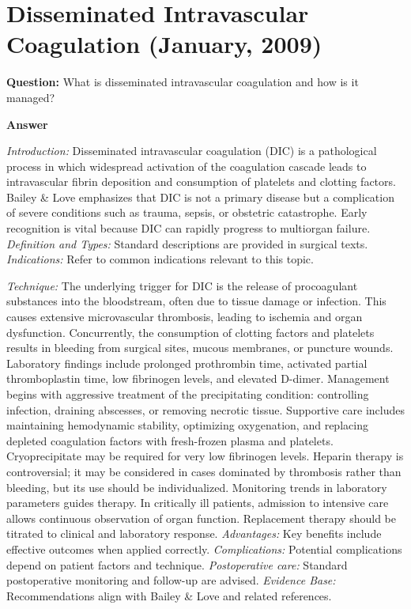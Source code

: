 \documentclass{article}
\begin{document}
\section{Disseminated Intravascular Coagulation (January, 2009)}

\textbf{Question:} What is disseminated intravascular coagulation and how is it managed?

\textbf{Answer}

\emph{Introduction:} Disseminated intravascular coagulation (DIC) is a pathological process in which widespread activation of the coagulation cascade leads to intravascular fibrin deposition and consumption of platelets and clotting factors. Bailey & Love emphasizes that DIC is not a primary disease but a complication of severe conditions such as trauma, sepsis, or obstetric catastrophe. Early recognition is vital because DIC can rapidly progress to multiorgan failure.
\emph{Definition and Types:} Standard descriptions are provided in surgical texts.
\emph{Indications:} Refer to common indications relevant to this topic.

\emph{Technique:} The underlying trigger for DIC is the release of procoagulant substances into the bloodstream, often due to tissue damage or infection. This causes extensive microvascular thrombosis, leading to ischemia and organ dysfunction. Concurrently, the consumption of clotting factors and platelets results in bleeding from surgical sites, mucous membranes, or puncture wounds. Laboratory findings include prolonged prothrombin time, activated partial thromboplastin time, low fibrinogen levels, and elevated D-dimer. Management begins with aggressive treatment of the precipitating condition: controlling infection, draining abscesses, or removing necrotic tissue. Supportive care includes maintaining hemodynamic stability, optimizing oxygenation, and replacing depleted coagulation factors with fresh-frozen plasma and platelets. Cryoprecipitate may be required for very low fibrinogen levels. Heparin therapy is controversial; it may be considered in cases dominated by thrombosis rather than bleeding, but its use should be individualized. Monitoring trends in laboratory parameters guides therapy. In critically ill patients, admission to intensive care allows continuous observation of organ function. Replacement therapy should be titrated to clinical and laboratory response.
\emph{Advantages:} Key benefits include effective outcomes when applied correctly.
\emph{Complications:} Potential complications depend on patient factors and technique.
\emph{Postoperative care:} Standard postoperative monitoring and follow-up are advised.
\emph{Evidence Base:} Recommendations align with Bailey & Love and related references.
\end{document}
